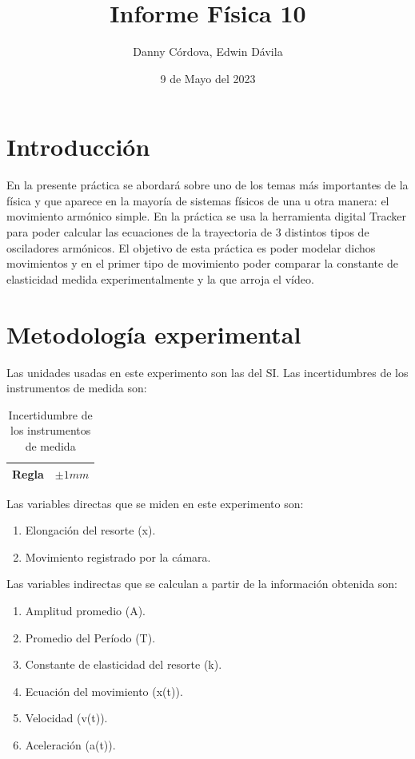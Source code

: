 \documentclass[a4paper]{article}
\title{Informe Física 10}
\author{Danny Córdova, Edwin Dávila}
\date{9 de Mayo del 2023}
\begin{document}
\maketitle

\section{Introducción}

En la presente práctica se abordará sobre uno de los temas más importantes de la física y que aparece en la mayoría de sistemas físicos de una u otra manera: el movimiento armónico simple. En la práctica se usa la herramienta digital Tracker para poder calcular las ecuaciones de la trayectoria de 3 distintos tipos de osciladores armónicos. El objetivo de esta práctica es poder modelar dichos movimientos y en el primer tipo de movimiento poder comparar la constante de elasticidad medida experimentalmente y la que arroja el vídeo.  

\section{Metodología experimental}

Las unidades usadas en este experimento son las del SI. Las incertidumbres de los instrumentos de medida son:

\begin{table}[H]
    \centering
    \begin{tabular}{|c|c|}
    \hline
        Regla  & $\pm 1 mm$ \\ \hline
    \end{tabular}
    \caption{Incertidumbre de los instrumentos de medida}
    \label{Incertidumbre de los instrumentos de medida}
\end{table}

Las variables directas que se miden en este experimento son:
\begin{enumerate}
  \item Elongación del resorte (x).
  \item Movimiento registrado por la cámara.
\end{enumerate}

Las variables indirectas que se calculan a partir de la información obtenida son:
\begin{enumerate}
  \item Amplitud promedio (A).
  \item Promedio del Período (T).
  \item Constante de elasticidad del resorte (k).
  \item Ecuación del movimiento (x(t)).
  \item Velocidad (v(t)).
  \item Aceleración (a(t)).
\end{enumerate}
\end{document}
